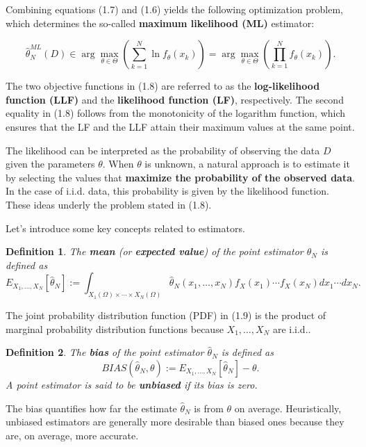 \documentclass{report}
\newtheorem{definition}{Definition}[chapter]
\begin{document}
Combining equations (1.7) and (1.6) yields the following optimization problem, which determines the so-called \textbf{maximum likelihood (ML)} estimator:

\begin{equation}
\hat{\theta}^{ML}_N(D) \in \arg \max_{\theta \in \Theta} \left(\sum_{k=1}^N \ln f_\theta(x_k)\right) = \arg \max_{\theta \in \Theta} \left(\prod_{k=1}^N f_\theta(x_k) \right).
\end{equation}

The two objective functions in (1.8) are referred to as the \textbf{log-likelihood function (LLF)} and the \textbf{likelihood function (LF)}, respectively.
The second equality in (1.8) follows from the monotonicity of the logarithm function, which ensures that the LF and the LLF attain their maximum values at the same point.

The likelihood can be interpreted as the probability of observing the data $D$ given the parameters $\theta$. When $\theta$ is unknown, a natural approach is to estimate it by selecting the values that \textbf{maximize the probability of the observed data}. In the case of i.i.d. data, this probability is given by the likelihood function. These ideas underly the problem stated in (1.8).

Let’s introduce some key concepts related to estimators.
\begin{definition}
The \textbf{mean} (or \textbf{expected value}) of the point estimator $\hat{\theta}_N$ is defined as
\begin{equation}
E_{X_1,\dots,X_N}[\hat{\theta}_N] := \int_{X_1(\Omega)\times \cdots \times X_N(\Omega)} \hat{\theta}_N(x_1,\dots,x_N)f_X(x_1)\cdots f_X(x_N) dx_1\cdots dx_N.
\end{equation}
\end{definition}

The joint probability distribution function (PDF) in (1.9) is the product of marginal probability distribution functions because $X_1,\dots,X_N$ are i.i.d..

\begin{definition}
The \textbf{bias} of the point estimator $\hat{\theta}_N$ is defined as
\begin{equation}
BIAS(\hat{\theta}_N,\theta) := E_{X_1,\dots,X_N}[\hat{\theta}_N] - \theta.
\end{equation}
A point estimator is said to be \textbf{unbiased} if its bias is zero.
\end{definition}

The bias quantifies how far the estimate $\hat{\theta}_N$ is from $\theta$ on average. Heuristically, unbiased estimators are generally more desirable than biased ones because they are, on average, more accurate.
\end{document}
